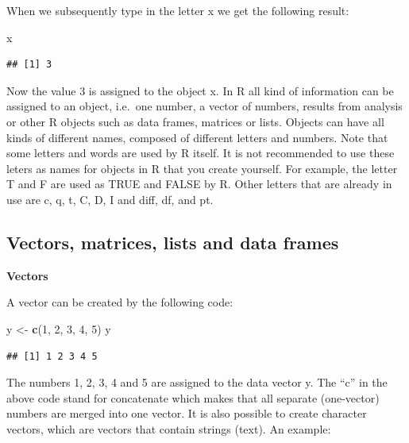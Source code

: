 \documentclass[
]{book}
\newenvironment{Shaded}{\begin{snugshade}}{\end{snugshade}}
\newcommand{\DecValTok}[1]{\textcolor[rgb]{0.00,0.00,0.81}{#1}}
\newcommand{\KeywordTok}[1]{\textcolor[rgb]{0.13,0.29,0.53}{\textbf{#1}}}
\newcommand{\NormalTok}[1]{#1}
\newcommand{\StringTok}[1]{\textcolor[rgb]{0.31,0.60,0.02}{#1}}
\begin{document}
When we subsequently type in the letter x we get the following result:

\begin{Shaded}
\begin{Highlighting}[]
\NormalTok{x }
\end{Highlighting}
\end{Shaded}

\begin{verbatim}
## [1] 3
\end{verbatim}

Now the value 3 is assigned to the object x. In R all kind of
information can be assigned to an object, i.e.~one number, a vector of
numbers, results from analysis or other R objects such as data frames,
matrices or lists. Objects can have all kinds of different names,
composed of different letters and numbers. Note that some letters and
words are used by R itself. It is not recommended to use these leters as
names for objects in R that you create yourself. For example, the letter
T and F are used as TRUE and FALSE by R. Other letters that are already
in use are c, q, t, C, D, I and diff, df, and pt.

\hypertarget{vectors-matrices-lists-and-data-frames}{%
\subsection{Vectors, matrices, lists and data
frames}\label{vectors-matrices-lists-and-data-frames}}

\textbf{Vectors}

A vector can be created by the following code:

\begin{Shaded}
\begin{Highlighting}[]
\NormalTok{y <-}\StringTok{ }\KeywordTok{c}\NormalTok{(}\DecValTok{1}\NormalTok{, }\DecValTok{2}\NormalTok{, }\DecValTok{3}\NormalTok{, }\DecValTok{4}\NormalTok{, }\DecValTok{5}\NormalTok{)}
\NormalTok{y}
\end{Highlighting}
\end{Shaded}

\begin{verbatim}
## [1] 1 2 3 4 5
\end{verbatim}

The numbers 1, 2, 3, 4 and 5 are assigned to the data vector y. The
``c'' in the above code stand for concatenate which makes that all
separate (one-vector) numbers are merged into one vector. It is also
possible to create character vectors, which are vectors that contain
strings (text). An example:
\end{document}

